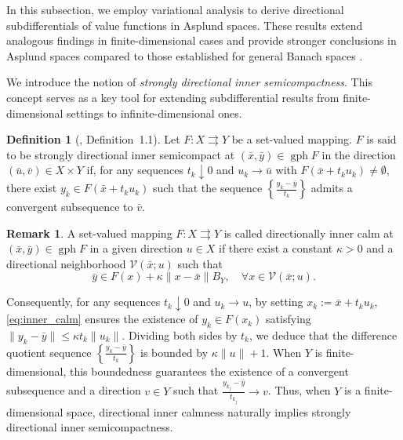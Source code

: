 \documentclass[12pt,twoside,reqno]{amsart}
\theoremstyle{definition}
\newtheorem{definition}[theorem]{Definition}
\newtheorem{remark}[theorem]{Remark}
\numberwithin{equation}{section}
\begin{document}
In this subsection, we employ variational analysis to derive directional subdifferentials of value functions in Asplund spaces. 
These results extend analogous findings in finite-dimensional cases \cite{benko2019calculus,Bai2023Directional} and provide stronger conclusions in Asplund spaces compared to those established for general Banach spaces \cite{long2017calculus}. 

We introduce the notion of \emph{strongly directional inner semicompactness}. This concept serves as a key tool for extending subdifferential results from finite-dimensional settings to infinite-dimensional ones. 

\begin{definition}[\cite{long2017calculusb}, Definition~1.1]\label{defn: directional strong inner semicompactness}
Let \( F: X \rightrightarrows Y \) be a set-valued mapping. 
\( F \) is said to be strongly directional inner semicompact at \( (\bar{x}, \bar{y}) \in \operatorname{gph} F \) in the direction \( (\bar{u},\bar v) \in X\times Y \) if, for any sequences \( t_k \downarrow 0 \) and \( u_k \to \bar{u} \) with \( F(\bar{x} + t_k u_k) \neq \emptyset \), there exist \( y_k \in F(\bar{x} + t_k u_k) \) such that the sequence \( \left\{ \frac{y_k - \bar{y}}{t_k} \right\} \) admits a convergent subsequence to $\bar v$.
\end{definition}

\begin{remark}\label{rem:inner_calm}
    A set-valued mapping $F: X \rightrightarrows Y$ is called directionally inner calm at $(\bar{x}, \bar{y}) \in \operatorname{gph} F$ in a given direction $u \in X$ if there exist a constant $\kappa > 0$ and a directional neighborhood $\mathcal{V}(\bar{x}; u)$ such that \cite[Definition 2.2]{benko2019calculus}
    \begin{equation}\label{eq:inner_calm}
        \bar{y} \in F(x) + \kappa \|x - \bar{x}\| B_Y, \quad \forall x \in \mathcal{V}(\bar{x}; u).
    \end{equation}

    Consequently, for any sequences $t_k \downarrow 0$ and $u_k \to u$, by setting $x_k := \bar{x} + t_k u_k$, \eqref{eq:inner_calm} ensures the existence of $y_k \in F(x_k)$ satisfying $\|y_k - \bar{y}\| \leq \kappa t_k \|u_k\|$. Dividing both sides by $t_k$, we deduce that the difference quotient sequence $\left\{ \frac{y_k - \bar{y}}{t_k} \right\}$ is bounded by $\kappa \|u\|+1$. When $Y$ is finite-dimensional, this boundedness guarantees the existence of a convergent subsequence and a direction $v \in Y$ such that $\frac{y_{k_j} - \bar{y}}{t_{k_j}} \to v$. Thus, when $Y$ is a finite-dimensional space, directional inner calmness naturally implies strongly directional inner semicompactness. 
\end{remark}
\end{document}
